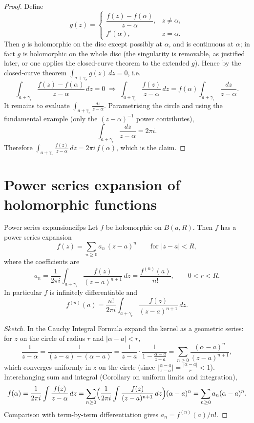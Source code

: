 \documentclass[11pt,openany]{report}
\newcommand{\abs}[1]{\left\lvert #1 \right\rvert}
\begin{document}
\begin{proof}
Define
\[
  g(z) =
  \begin{cases}
    \dfrac{f(z)-f(\alpha)}{z-\alpha}, & z\ne\alpha,\\[8pt]
    f'(\alpha), & z=\alpha.
  \end{cases}
\]
Then $g$ is holomorphic on the disc except possibly at $\alpha$, and is continuous at
$\alpha$; in fact $g$ is holomorphic on the whole disc (the singularity is removable, as
justified later, or one applies the closed-curve theorem to the extended $g$). Hence by the
closed-curve theorem $\int_{a+\gamma_r} g(z)\,dz=0$, i.e.
\[
  \int_{a+\gamma_r}\frac{f(z)-f(\alpha)}{z-\alpha}\,dz = 0
  \;\Longrightarrow\;
  \int_{a+\gamma_r}\frac{f(z)}{z-\alpha}\,dz
  = f(\alpha)\int_{a+\gamma_r}\frac{dz}{z-\alpha}.
\]
It remains to evaluate $\int_{a+\gamma_r}\frac{dz}{z-\alpha}$. Parametrising the circle and
using the fundamental example (only the $(z-\alpha)^{-1}$ power contributes),
\[
  \int_{a+\gamma_r}\frac{dz}{z-\alpha} = 2\pi i .
\]
Therefore $\int_{a+\gamma_r}\frac{f(z)}{z-\alpha}\,dz = 2\pi i\, f(\alpha)$, which is the
claim.
\end{proof}

\section{Power series expansion of holomorphic functions}

\begin{corollary}{Power series expansion}{cifps}
Let $f$ be holomorphic on $B(a,R)$. Then $f$ has a power series expansion
\[
  f(z) = \sum_{n\ge0} a_n\,(z-a)^n \qquad \text{for } \abs{z-a}<R,
\]
where the coefficients are
\[
  a_n = \frac{1}{2\pi i}\int_{a+\gamma_r}\frac{f(z)}{(z-a)^{n+1}}\,dz
      = \frac{f^{(n)}(a)}{n!}, \qquad 0<r<R .
\]
In particular $f$ is infinitely differentiable and
\[
  \boxed{\ f^{(n)}(a) = \frac{n!}{2\pi i}\int_{a+\gamma_r}\frac{f(z)}{(z-a)^{n+1}}\,dz.\ }
\]
\end{corollary}

\begin{proof}[Sketch]
In the Cauchy Integral Formula expand the kernel as a geometric series: for $z$ on the
circle of radius $r$ and $\abs{\alpha-a}<r$,
\[
  \frac{1}{z-\alpha}
  = \frac{1}{(z-a)-(\alpha-a)}
  = \frac{1}{z-a}\cdot\frac{1}{1-\frac{\alpha-a}{z-a}}
  = \sum_{n\ge0}\frac{(\alpha-a)^n}{(z-a)^{n+1}},
\]
which converges uniformly in $z$ on the circle (since
$\bigl\lvert\frac{\alpha-a}{z-a}\bigr\rvert=\frac{\abs{\alpha-a}}{r}<1$). Interchanging sum
and integral (Corollary on uniform limits and integration),
\[
  f(\alpha) = \frac{1}{2\pi i}\int\frac{f(z)}{z-\alpha}\,dz
  = \sum_{n\ge0}\Bigl(\frac{1}{2\pi i}\int\frac{f(z)}{(z-a)^{n+1}}\,dz\Bigr)(\alpha-a)^n
  = \sum_{n\ge0}a_n(\alpha-a)^n .
\]
Comparison with term-by-term differentiation gives $a_n=f^{(n)}(a)/n!$.
\end{proof}
\end{document}
